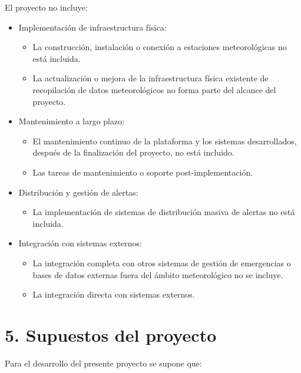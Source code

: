 \documentclass[
11pt, %
codirector, %
]{charter}
\begin{document}
El proyecto no incluye:
\begin{itemize}
	\item Implementación de infraestructura física:
		\begin{itemize}
		\item La construcción, instalación o conexión a estaciones meteorológicas no está incluida.
		\item La actualización o mejora de la infraestructura física existente de recopilación de datos meteorológicos no forma parte del alcance del proyecto.
		\end{itemize}
	\item Mantenimiento a largo plazo:
		\begin{itemize}
		\item El mantenimiento continuo de la plataforma y los sistemas desarrollados, después de la finalización del proyecto, no está incluido.
		\item Las tareas de mantenimiento o soporte post-implementación.
		\end{itemize}
	\item Distribución y gestión de alertas:
		\begin{itemize}
		\item La implementación de sistemas de distribución masiva de alertas no está incluida.
		\end{itemize}
	\item Integración con sistemas externos:
		\begin{itemize}
		\item La integración completa con otros sistemas de gestión de emergencias o bases de datos externas fuera del ámbito meteorológico no se incluye.
		\item La integración directa con sistemas externos.
		\end{itemize}

\end{itemize}

\section{5. Supuestos del proyecto}
\label{sec:supuestos}

Para el desarrollo del presente proyecto se supone que: 
\end{document}
